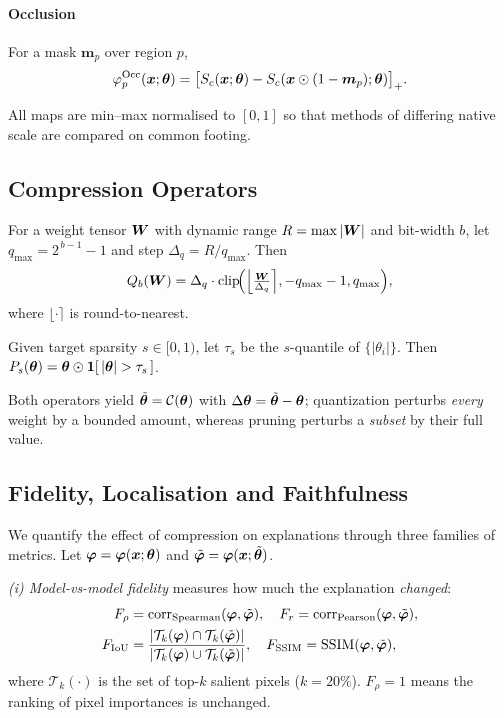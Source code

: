 \paragraph{Occlusion \cite{zeiler2014visualizing}}
For a mask $\bm m_p$ over region $p$,
\begin{equation}
\varphi^{\mathrm{Occ}}_p(\bm{x};\bm{\theta})=\bigl[S_c(\bm{x};\bm{\theta})-
S_c(\bm{x}\odot(1-\bm m_p);\bm{\theta})\bigr]_{+}.
\label{eq:occ}
\end{equation}

All maps are min--max normalised to $[0,1]$ so that methods of differing native
scale are compared on common footing.

\subsection{Compression Operators}
\begin{definition}
For a weight tensor $\bm{W}$ with dynamic range $R=\max|\bm{W}|$ and bit-width $b$,
let $q_{\max}=2^{\,b-1}-1$ and step $\Delta_q=R/q_{\max}$. Then
\begin{equation}
Q_b(\bm{W})=\Delta_q\cdot\mathrm{clip}\!\Bigl(\Bigl\lfloor\tfrac{\bm{W}}{\Delta_q}
\Bigr\rceil,-q_{\max}-1,q_{\max}\Bigr),
\label{eq:quant}
\end{equation}
where $\lfloor\cdot\rceil$ is round-to-nearest.
\end{definition}

\begin{definition}
Given target sparsity $s\in[0,1)$, let $\tau_s$ be the $s$-quantile of
$\{|\theta_i|\}$. Then $P_s(\btheta)=\btheta\odot\bm 1[\,|\btheta|>\tau_s\,]$.
\end{definition}

Both operators yield $\tilde{\bm{\theta}}=\mathcal{C}(\bm{\theta})$ with
$\Delta\bm{\theta}=\tilde{\bm{\theta}}-\bm{\theta}$; quantization perturbs \emph{every}
weight by a bounded amount, whereas pruning perturbs a \emph{subset} by their
full value.

\subsection{Fidelity, Localisation and Faithfulness}
We quantify the effect of compression on explanations through three families
of metrics. Let $\bm{\varphi}=\bm{\varphi}(\bm{x};\bm{\theta})$ and $\tilde{\bm{\varphi}}=\bm{\varphi}(\bm{x};
\tilde{\bm{\theta}})$.

\emph{(i) Model-vs-model fidelity} measures how much the explanation
\emph{changed}:
\begin{align}
F_{\rho}&=\operatorname{corr}_{\mathrm{Spearman}}(\bm{\varphi},\tilde{\bm{\varphi}}),\quad
F_{r}=\operatorname{corr}_{\mathrm{Pearson}}(\bm{\varphi},\tilde{\bm{\varphi}}),\\
F_{\mathrm{IoU}}&=\frac{|\mathcal T_k(\bm{\varphi})\cap\mathcal T_k(\tilde{\bm{\varphi}})|}
{|\mathcal T_k(\bm{\varphi})\cup\mathcal T_k(\tilde{\bm{\varphi}})|},\quad
F_{\mathrm{SSIM}}=\mathrm{SSIM}(\bm{\varphi},\tilde{\bm{\varphi}}),
\end{align}
where $\mathcal T_k(\cdot)$ is the set of top-$k$ salient pixels
($k=20\%$). $F_\rho=1$ means the ranking of pixel importances is unchanged.

